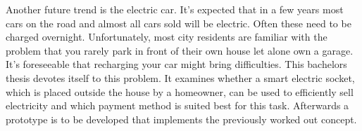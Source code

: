 Another future trend is the electric car. It’s expected that in a few years most cars on the road and almost all cars sold will be electric. Often these need to be charged overnight. Unfortunately, most city residents are familiar with the problem that you rarely park in front of their own house let alone  own a garage. It’s foreseeable that recharging your car might bring difficulties. This bachelors thesis devotes itself to this problem. It examines whether a smart electric socket, which is placed outside the house by a homeowner, can be used to efficiently sell electricity and which payment method is suited best for this task. Afterwards a prototype is to be developed that implements the previously worked out concept.\\\\